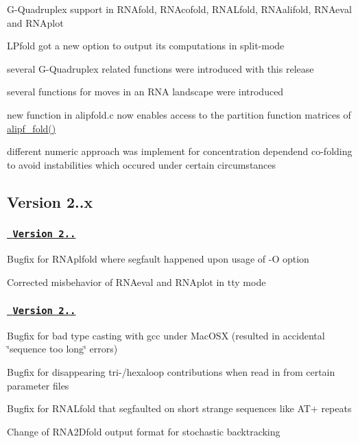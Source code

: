 \begin{DoxyItemize}
\item G-\/\+Quadruplex support in R\+N\+Afold, R\+N\+Acofold, R\+N\+A\+Lfold, R\+N\+Aalifold, R\+N\+Aeval and R\+N\+Aplot
\item L\+Pfold got a new option to output its computations in split-\/mode
\item several G-\/\+Quadruplex related functions were introduced with this release
\item several functions for moves in an R\+NA landscape were introduced
\item new function in alipfold.\+c now enables access to the partition function matrices of \mbox{\hyperlink{group__part__func__global__deprecated_ga1a5f6cfb9d761fa862ce4edc7c369cd2}{alipf\+\_\+fold()}}
\item different numeric approach was implement for concentration dependend co-\/folding to avoid instabilities which occured under certain circumstances
\end{DoxyItemize}

\subsection*{Version 2..\+x}

\subsubsection*{\href{https://github.com/ViennaRNA/ViennaRNA/compare/v2.0.6...v2.0.7}{\texttt{ Version 2..}}}


\begin{DoxyItemize}
\item Bugfix for R\+N\+Aplfold where segfault happened upon usage of -\/O option
\item Corrected misbehavior of R\+N\+Aeval and R\+N\+Aplot in tty mode
\end{DoxyItemize}

\subsubsection*{\href{https://github.com/ViennaRNA/ViennaRNA/compare/v2.0.5...v2.0.6}{\texttt{ Version 2..}}}


\begin{DoxyItemize}
\item Bugfix for bad type casting with gcc under Mac\+O\+SX (resulted in accidental \char`\"{}sequence too long\char`\"{} errors)
\item Bugfix for disappearing tri-\//hexaloop contributions when read in from certain parameter files
\item Bugfix for R\+N\+A\+Lfold that segfaulted on short strange sequences like A\+T+ repeats
\item Change of R\+N\+A2\+Dfold output format for stochastic backtracking
\end{DoxyItemize}

